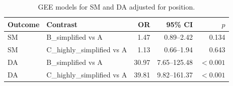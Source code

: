 \begin{table}[H]
\caption{GEE models for SM and DA adjusted for position.}
\label{tab:position:adjusted}
\centering
\begin{tabular}{llrrr}
\toprule
Outcome & Contrast & OR & 95\% CI & $p$ \\
\midrule
SM & B_simplified vs A & 1.47 & 0.89--2.42 & 0.134 \\
SM & C_highly_simplified vs A & 1.13 & 0.66--1.94 & 0.643 \\
DA & B_simplified vs A & 30.97 & 7.65--125.48 & $<0.001$ \\
DA & C_highly_simplified vs A & 39.81 & 9.82--161.37 & $<0.001$ \\
\bottomrule
\end{tabular}
\end{table}
